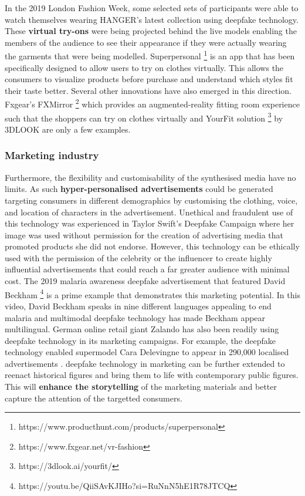 In the 2019 London Fashion Week, some selected sets of participants were able to watch themselves wearing HANGER’s latest collection using deepfake technology. These \textbf{virtual try-ons} were being projected behind the live models enabling the members of the audience to see their appearance if they were actually wearing the garments that were being modelled. Superpersonal \footnote{https://www.producthunt.com/products/superpersonal} is an app that has been specifically designed to allow users to try on clothes virtually. This allows the consumers to visualize products before purchase and understand which styles fit their taste better. Several other innovations have also emerged in this direction. Fxgear's FXMirror \footnote{https://www.fxgear.net/vr-fashion} which provides an augmented-reality fitting room experience such that the shoppers can try on clothes virtually and YourFit solution \footnote{https://3dlook.ai/yourfit/} by 3DLOOK are only a few examples. 

\subsubsection{Marketing industry}
 
Furthermore, the flexibility and customisability of the synthesised media have no limits. As such \textbf{hyper-personalised advertisements} could be generated targeting consumers in different demographics by customising the clothing, voice, and location of characters in the advertisement. Unethical and fraudulent use of this technology was experienced in Taylor Swift's Deepfake Campaign where her image was used without permission for the creation of advertising media that promoted products she did not endorse. However, this technology can be ethically used with the permission of the celebrity or the influencer to create highly influential advertisements that could reach a far greater audience with minimal cost. The 2019 malaria awareness deepfake advertisement that featured David Beckham \footnote{https://youtu.be/QiiSAvKJIHo?si=RuNnN5hE1R78JTCQ} is a prime example that demonstrates this marketing potential. In this video, David Beckham speaks in nine different languages appealing to end malaria and multimodal deepfake technology has made Beckham appear multilingual. German online retail giant Zalando has also been readily using deepfake technology in its marketing campaigns. For example, the deepfake technology enabled supermodel Cara Delevingne to appear in 290,000 localised advertisements \cite{deepfakevoguebusiness}. deepfake technology in marketing can be further extended to reenact historical figures and bring them to life with contemporary public figures. This will \textbf{enhance the storytelling} of the marketing materials and better capture the attention of the targetted consumers. 

